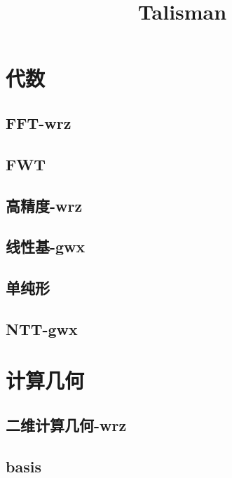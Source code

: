 \documentclass[titlepage,a4paper,10pt]{article}
\title{Talisman}
\begin{document}
	\maketitle
	\begin{multicols}{2}
		\setcounter{tocdepth}{3}
		\begingroup
		\let\cleardoublepage\relax
		\let\clearpage\relax
		\renewcommand{\contentsname}{目录}
		\tableofcontents
		\newpage
		\begin{spacing}{0.8}
		\footnotesize
		\section{代数}
			\subsection{FFT-wrz}
				
			\subsection{FWT}
				
			\subsection{高精度-wrz}
				
			\subsection{线性基-gwx}
				
			\subsection{单纯形}
				
			\subsection{NTT-gwx}
				
		\section{计算几何}
			\subsection{二维计算几何-wrz}
				
			\subsection{basis}
				

\end{spacing}
\end{multicols}
\end{document}
